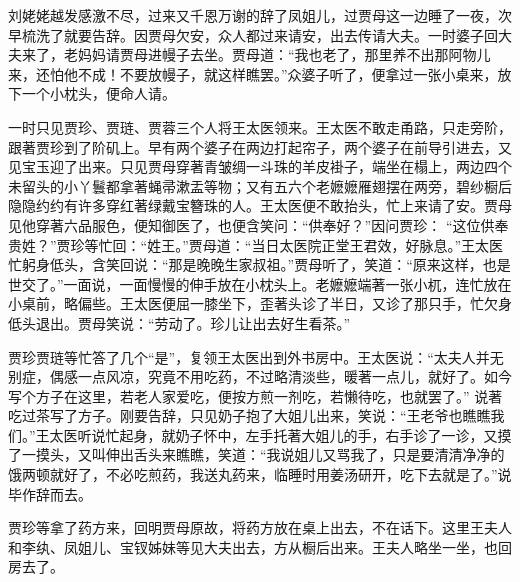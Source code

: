 \begin{parag}
    刘姥姥越发感激不尽，过来又千恩万谢的辞了凤姐儿，过贾母这一边睡了一夜，次早梳洗了就要告辞。因贾母欠安，众人都过来请安，出去传请大夫。一时婆子回大夫来了，老妈妈请贾母进幔子去坐。贾母道：“我也老了，那里养不出那阿物儿来，还怕他不成！不要放幔子，就这样瞧罢。”众婆子听了，便拿过一张小桌来，放下一个小枕头，便命人请。
\end{parag}


\begin{parag}
    一时只见贾珍、贾琏、贾蓉三个人将王太医领来。王太医不敢走甬路，只走旁阶，跟著贾珍到了阶矶上。早有两个婆子在两边打起帘子，两个婆子在前导引进去，又见宝玉迎了出来。只见贾母穿著青皱绸一斗珠的羊皮褂子，端坐在榻上，两边四个未留头的小丫鬟都拿著蝇帚漱盂等物；又有五六个老嬷嬷雁翅摆在两旁，碧纱橱后隐隐约约有许多穿红著绿戴宝簪珠的人。王太医便不敢抬头，忙上来请了安。贾母见他穿著六品服色，便知御医了，也便含笑问：“供奉好？”因问贾珍： “这位供奉贵姓？”贾珍等忙回：“姓王。”贾母道：“当日太医院正堂王君效，好脉息。”王太医忙躬身低头，含笑回说：“那是晚晚生家叔祖。”贾母听了，笑道：“原来这样，也是世交了。”一面说，一面慢慢的伸手放在小枕头上。老嬷嬷端著一张小杌，连忙放在小桌前，略偏些。王太医便屈一膝坐下，歪著头诊了半日，又诊了那只手，忙欠身低头退出。贾母笑说：“劳动了。珍儿让出去好生看茶。”
\end{parag}


\begin{parag}
    贾珍贾琏等忙答了几个“是”，复领王太医出到外书房中。王太医说：“太夫人并无别症，偶感一点风凉，究竟不用吃药，不过略清淡些，暖著一点儿，就好了。如今写个方子在这里，若老人家爱吃，便按方煎一剂吃，若懒待吃，也就罢了。” 说著吃过茶写了方子。刚要告辞，只见奶子抱了大姐儿出来，笑说：“王老爷也瞧瞧我们。”王太医听说忙起身，就奶子怀中，左手托著大姐儿的手，右手诊了一诊，又摸了一摸头，又叫伸出舌头来瞧瞧，笑道：“我说姐儿又骂我了，只是要清清净净的饿两顿就好了，不必吃煎药，我送丸药来，临睡时用姜汤研开，吃下去就是了。”说毕作辞而去。
\end{parag}


\begin{parag}
    贾珍等拿了药方来，回明贾母原故，将药方放在桌上出去，不在话下。这里王夫人和李纨、凤姐儿、宝钗姊妹等见大夫出去，方从橱后出来。王夫人略坐一坐，也回房去了。
\end{parag}


